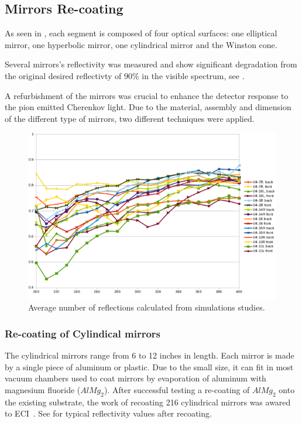 \subsection{Mirrors Re-coating}

As seen in , each segment is composed of four optical surfaces: one elliptical mirror,
one hyperbolic mirror, one cylindrical mirror and the Winston cone.

Several mirrors's reflectivity was measured and show significant degradation from the original
desired reflectivty of $90\%$ in the visible spectrum, see .

A refurbishment of the mirrors was crucial to enhance the detector response to the pion emitted Cherenkov light.
Due to the material, assembly and dimension of the different type of mirrors, two different techniques were applied.

\begin{figure}
\centering
	\includegraphics[width=1.0\columnwidth,keepaspectratio]{img/mirrorsReflectivityBefore.png}
	\caption{Average number of reflections calculated from simulations studies.}
	\label{fig:reflectivityBefore}
\end{figure}


\subsubsection{Re-coating of Cylindical mirrors}

The cylindrical mirrors range from 6 to 12 inches in length. Each mirror is made by a single piece of aluminum or plastic.
Due to the small size, it can fit in most vacuum chambers used to coat mirrors by evaporation of aluminum with magnesium fluoride
($AlMg_2$). After successful testing a re-coating of $AlMg_2$ onto the existing substrate, the work of recoating 216 cylindrical mirrors
was awared to ECI~\cite{ECI}. See  for typical reflectivity values after recoating.


